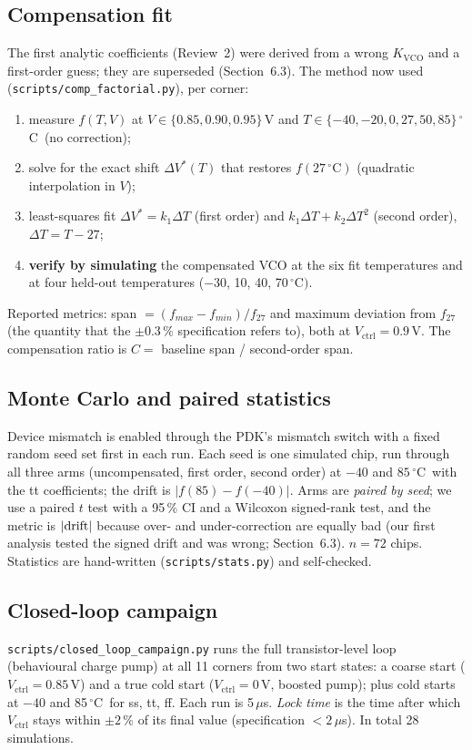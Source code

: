 \documentclass[11pt,a4paper]{article}
\newcommand{\kvco}{K_{\mathrm{VCO}}}
\newcommand{\vc}{V_{\mathrm{ctrl}}}
\newcommand{\degC}{\,$^\circ$C}
\begin{document}
\subsection{Compensation fit}
The first analytic coefficients (Review~2) were derived from a wrong $\kvco$ and a first-order guess; they are superseded (Section~6.3). The method now used (\texttt{scripts/comp\_factorial.py}), per corner:
\begin{enumerate}[nosep]
\item measure $f(T,V)$ at $V\in\{0.85,0.90,0.95\}$\,V and $T\in\{-40,-20,0,27,50,85\}$\degC\ (no correction);
\item solve for the exact shift $\Delta V^*(T)$ that restores $f(27\,^\circ\mathrm C)$ (quadratic interpolation in $V$);
\item least-squares fit $\Delta V^*=k_1\Delta T$ (first order) and $k_1\Delta T+k_2\Delta T^2$ (second order), $\Delta T=T-27$;
\item \textbf{verify by simulating} the compensated VCO at the six fit temperatures and at four held-out temperatures ($-30$, 10, 40, 70\degC$)$.
\end{enumerate}
Reported metrics: span $=(f_{max}-f_{min})/f_{27}$ and maximum deviation from $f_{27}$ (the quantity that the $\pm0.3\,\%$ specification refers to), both at $\vc=0.9$\,V. The compensation ratio is $C=$ baseline span / second-order span.

\subsection{Monte Carlo and paired statistics}
Device mismatch is enabled through the PDK's mismatch switch with a fixed random seed set first in each run. Each seed is one simulated chip, run through all three arms (uncompensated, first order, second order) at $-40$ and $85$\degC\ with the tt coefficients; the drift is $|f(85)-f(-40)|$. Arms are \emph{paired by seed}; we use a paired $t$ test with a 95\,\% CI and a Wilcoxon signed-rank test, and the metric is $|{\rm drift}|$ because over- and under-correction are equally bad (our first analysis tested the signed drift and was wrong; Section~6.3). $n=72$ chips. Statistics are hand-written (\texttt{scripts/stats.py}) and self-checked.

\subsection{Closed-loop campaign}
\texttt{scripts/closed\_loop\_campaign.py} runs the full transistor-level loop (behavioural charge pump) at all 11 corners from two start states: a coarse start ($\vc=0.85$\,V) and a true cold start ($\vc=0$\,V, boosted pump); plus cold starts at $-40$ and 85\degC\ for ss, tt, ff. Each run is 5\,$\mu$s. \emph{Lock time} is the time after which $\vc$ stays within $\pm2\,\%$ of its final value (specification $<2\,\mu$s). In total 28 simulations.
\end{document}
